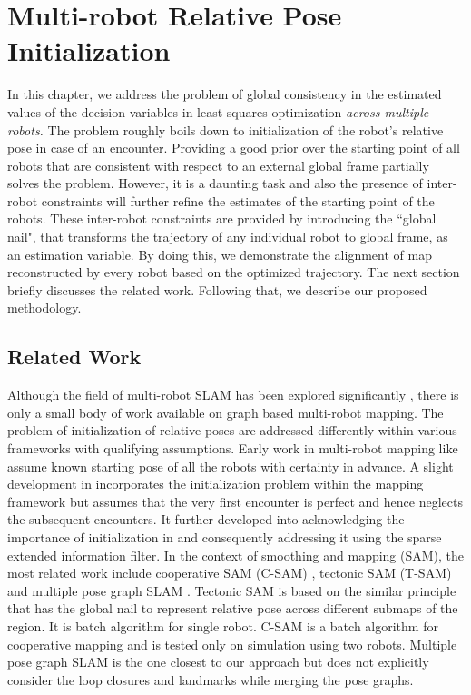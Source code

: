 \chapter{Multi-robot Relative Pose Initialization}
\label{chap:four}

In this chapter, we address the problem of global consistency in the estimated values of the decision variables in least squares optimization \textit{across multiple robots.} The problem roughly boils down to initialization of the robot's relative pose in case of an encounter. Providing a good prior over the starting point of all robots that are consistent with respect to an external global frame partially solves the problem. However, it is a daunting task and also the presence of inter-robot constraints will further refine the estimates of the starting point of the robots. These inter-robot constraints are provided by introducing the ``global nail", that transforms the trajectory of any individual robot to global frame, as an estimation variable. By doing this, we demonstrate the alignment of map reconstructed by every robot based on the optimized trajectory. The next section briefly discusses the related work. Following that, we describe our proposed methodology. 

\section{Related Work}
Although the field of multi-robot SLAM has been explored significantly \cite{multi1, multi2, multi3, thrunmulti}, there is only a small body of work available on graph based multi-robot mapping. The problem of initialization of relative poses are addressed differently within various frameworks with qualifying assumptions. Early work in multi-robot mapping like \cite{multi3} assume known starting pose of all the robots with certainty in advance. A slight development in \cite{howardmulti} incorporates the initialization problem within the mapping framework but assumes that the very first encounter is perfect and hence neglects the subsequent encounters. It further developed into acknowledging the importance of initialization in \cite{thrunmulti} and consequently addressing it using the sparse extended information filter. In the context of smoothing and mapping (SAM), the most related work include cooperative SAM (C-SAM) \cite{csam}, tectonic SAM (T-SAM) \cite{tectonicsam} and multiple pose graph SLAM \cite{multipleisam}. Tectonic SAM is based on the similar principle that has the global nail to represent relative pose across different submaps of the region. It is batch algorithm for single robot. C-SAM is a batch algorithm for cooperative mapping and is tested only on simulation using two robots. Multiple pose graph SLAM is the one closest to our approach but does not explicitly consider the loop closures and landmarks while merging the pose graphs. 
 
